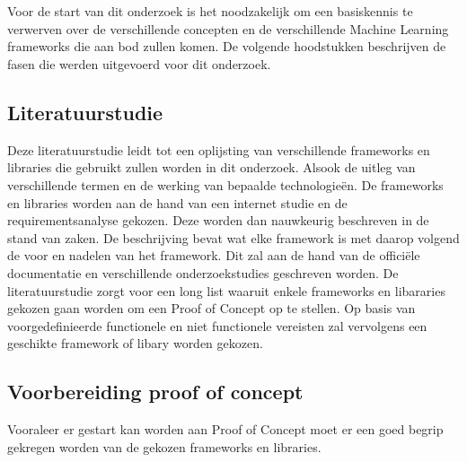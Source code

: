 
\chapter{}%
\label{ch:methodologie}


Voor de start van dit onderzoek is het noodzakelijk om een basiskennis te verwerven over de verschillende concepten en de verschillende Machine Learning frameworks die aan bod zullen komen. De volgende hoodstukken beschrijven de fasen die werden uitgevoerd voor dit onderzoek.

\section{Literatuurstudie}
Deze literatuurstudie leidt tot een oplijsting van verschillende frameworks en libraries die gebruikt zullen worden in dit onderzoek. Alsook de uitleg van verschillende termen en de werking van bepaalde technologieën.
De frameworks en libraries worden aan de hand van een internet studie en de requirementsanalyse gekozen. Deze worden dan nauwkeurig beschreven in de stand van zaken. De beschrijving bevat wat elke framework is met daarop volgend de voor en nadelen van het framework.
Dit zal aan de hand van de officiële documentatie en verschillende onderzoekstudies geschreven worden.
De literatuurstudie zorgt voor een long list waaruit enkele frameworks en libararies gekozen gaan worden om een Proof of Concept op te stellen.
Op basis van voorgedefinieerde functionele en niet functionele vereisten zal vervolgens een geschikte framework of libary worden gekozen.
\section{Voorbereiding proof of concept}
Vooraleer er gestart kan worden aan Proof of Concept moet er een goed begrip gekregen worden van de gekozen frameworks en libraries. 

